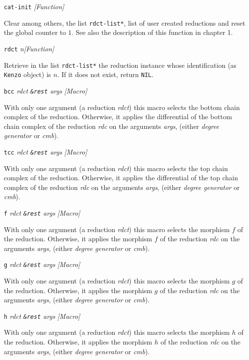 {\parindent=0mm
{\leftskip=5mm
{\leftskip=5mm
{\tt cat-init} \hfill {\em [Function]} \par}
{\leftskip=15mm
Clear among others, the list {\tt *rdct-list*}, list of user created reductions  and reset
the global counter to $1$. See also the description of this function in chapter 1. \par}
{\tt rdct} {\em n}\hfill {\em [Function]} \par}
{\leftskip=15mm
Retrieve in the list {\tt *rdct-list*} the reduction instance whose identification
(as {\tt Kenzo} object) is $n$. If it does not exist, return {\tt NIL}. \par}
{\leftskip=5mm
{\tt bcc} {\em rdct {\tt \&rest} args} \hfill {\em [Macro]} \par}
{\leftskip=15mm
With only one argument (a reduction {\em rdct}) this macro selects
the bottom chain complex of the reduction. Otherwise, it applies  the differential
of the bottom chain complex of the reduction {\em rdc} on the arguments {\em args},
(either {\em degree generator} or {\em cmb}).  \par}
{\leftskip=5mm
{\tt tcc} {\em rdct {\tt \&rest} args} \hfill {\em [Macro]} \par}
{\leftskip=15mm
With only one argument (a reduction {\em rdct}) this macro selects
the top chain complex of the reduction. Otherwise, it applies  the differential
of the top chain complex of the reduction {\em rdc} on the arguments {\em args},
(either {\em degree generator} or {\em cmb}).  \par}
{\leftskip=5mm
{\tt f} {\em rdct {\tt \&rest} args} \hfill {\em [Macro]} \par}
{\leftskip=15mm
With only one argument (a reduction {\em rdct}) this macro selects
the morphism $f$ of the reduction. Otherwise, it applies  the morphism $f$
of the reduction {\em rdc} on the arguments {\em args},
(either {\em degree generator} or {\em cmb}).  \par}
{\leftskip=5mm
{\tt g} {\em rdct {\tt \&rest} args} \hfill {\em [Macro]} \par}
{\leftskip=15mm
With only one argument (a reduction {\em rdct}) this macro selects
the morphism $g$ of the reduction. Otherwise, it applies  the morphism $g$
of the reduction {\em rdc} on the arguments {\em args},
(either {\em degree generator} or {\em cmb}).  \par}
{\leftskip=5mm
{\tt h} {\em rdct {\tt \&rest} args} \hfill {\em [Macro]} \par}
{\leftskip=15mm
With only one argument (a reduction {\em rdct}) this macro selects
the morphism $h$ of the reduction. Otherwise, it applies  the morphism $h$
of the reduction {\em rdc} on the arguments {\em args},
(either {\em degree generator} or {\em cmb}).  \par}
}
